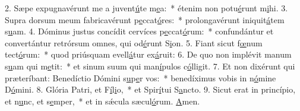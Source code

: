 2. Sæpe expugnavérunt me a juvent\uline{ú}te m\uline{e}a:~* étenim non potu\uline{é}runt m\uline{i}hi.
3. Supra dorsum meum fabricavérunt p\uline{e}ccat\uline{ó}res:~* prolongavérunt iniquit\uline{á}tem s\uline{u}am.
4. Dóminus justus concídit cervíces p\uline{e}ccat\uline{ó}rum:~* confundántur et convertántur retrórsum omnes, qui od\uline{é}runt S\uline{i}on.
5. Fiant sicut f\uline{œ}num tect\uline{ó}rum:~* quod priúsquam evell\uline{á}tur ex\uline{á}ruit:
6. De quo non implévit manum s\uline{u}am qui m\uline{e}tit:~* et sinum suum qui man\uline{í}pulos c\uline{ó}lligit.
7. Et non dixérunt qui præteríbant: Benedíctio Dómini s\uline{u}p\uline{e}r vos:~* benedíximus vobis in n\uline{ó}mine D\uline{ó}mini.
8. Glória Patri, et F\uline{í}l\uline{i}o,~* et Spir\uline{í}tui S\uline{a}ncto.
9. Sicut erat in princípio, et n\uline{u}nc, et s\uline{e}mper,~* et in sǽcula sæcul\uline{ó}rum. \uline{A}men.
